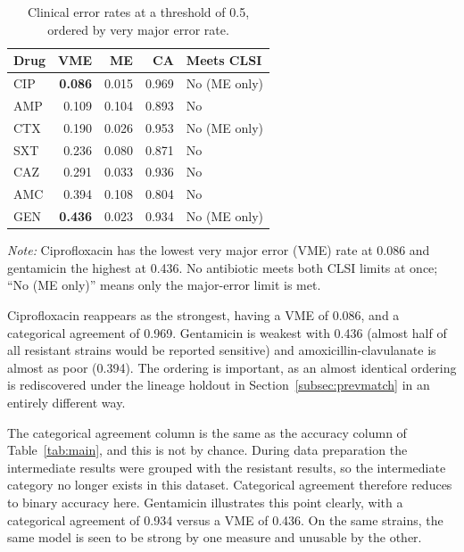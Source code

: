 \documentclass[journal]{IEEEtran}
\begin{document}
\begin{table}[!tb]
\caption{Clinical error rates at a threshold of 0.5, ordered by very major error
rate.}
\label{tab:clinical}
\centering
\small
\setlength{\tabcolsep}{4pt}
\renewcommand{\arraystretch}{1.05}
\begin{tabular}{|l|r|r|r|l|}
\hline
\rowcolor{headgrey}
\textbf{Drug} & \textbf{VME} & \textbf{ME} & \textbf{CA} & \textbf{Meets CLSI} \\ \hline
CIP & \textbf{0.086} & 0.015 & 0.969 & No (ME only) \\ \hline
AMP & 0.109 & 0.104 & 0.893 & No \\ \hline
CTX & 0.190 & 0.026 & 0.953 & No (ME only) \\ \hline
SXT & 0.236 & 0.080 & 0.871 & No \\ \hline
CAZ & 0.291 & 0.033 & 0.936 & No \\ \hline
AMC & 0.394 & 0.108 & 0.804 & No \\ \hline
GEN & \textbf{0.436} & 0.023 & 0.934 & No (ME only) \\ \hline
\end{tabular}
\renewcommand{\arraystretch}{1.0}
\vspace{0.4em}

\noindent\footnotesize\textit{Note:} Ciprofloxacin has the lowest very major error (VME) rate at
0.086 and gentamicin the highest at 0.436. No antibiotic meets both CLSI limits at once;
``No (ME only)'' means only the major-error limit is met.
\end{table}

Ciprofloxacin reappears as the strongest, having a VME of 0.086, and a categorical
agreement of 0.969. Gentamicin is weakest with 0.436 (almost half of all resistant
strains would be reported sensitive) and amoxicillin-clavulanate is almost as poor
(0.394). The ordering is important, as an almost identical ordering is rediscovered
under the lineage holdout in Section~\ref{subsec:prevmatch} in an entirely different
way.

The categorical agreement column is the same as the accuracy column of
Table~\ref{tab:main}, and this is not by chance. During data preparation the
intermediate results were grouped with the resistant results, so the intermediate
category no longer exists in this dataset. Categorical agreement therefore reduces to
binary accuracy here. Gentamicin illustrates this point clearly, with a categorical
agreement of 0.934 versus a VME of 0.436. On the same strains, the same model is seen
to be strong by one measure and unusable by the other.
\end{document}
